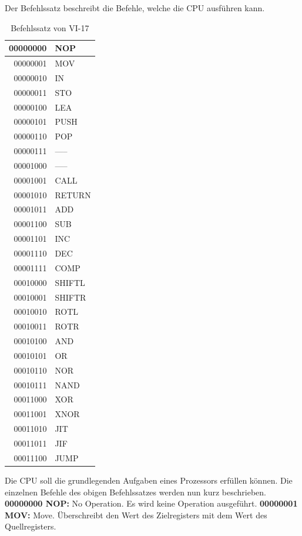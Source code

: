 \documentclass[12pt]{article}
\begin{document}
Der Befehlssatz beschreibt die Befehle, welche die CPU ausführen kann.
\newpage
\begin{table}[!htb]
\centering
\caption{Befehlssatz von VI-17}
\begin{tabular}{|r|l|}
  \hline
  00000000 & NOP \\
  \hline
  00000001 & MOV\\ 
  \hline
  00000010 & IN\\
  \hline
  00000011 & STO\\
  \hline
  00000100 & LEA\\
  \hline
  00000101 & PUSH \\ 
  \hline
  00000110 & POP\\
  \hline
  00000111 & -----\\
 \hline
  00001000 & ----- \\
  \hline
  00001001 & CALL\\ 
  \hline
  00001010 & RETURN\\
  \hline
  00001011 & ADD\\
  \hline 
 00001100 & SUB \\
  \hline
  00001101 & INC\\ 
  \hline
  00001110 & DEC\\
  \hline
  00001111 & COMP\\
  \hline
  00010000 & SHIFTL\\
  \hline
  00010001 & SHIFTR\\ 
  \hline
  00010010 & ROTL\\
  \hline
  00010011 & ROTR\\
  \hline
  00010100 & AND\\
  \hline
  00010101 & OR \\ 
  \hline
  00010110 & NOR\\
  \hline
  00010111 & NAND\\
  \hline
  00011000 & XOR\\
  \hline
  00011001 & XNOR \\
  \hline
  00011010 & JIT\\
  \hline
  00011011 & JIF\\
  \hline
  00011100 & JUMP\\
  \hline
\end{tabular}
\end{table}
\newpage
Die CPU soll die grundlegenden Aufgaben eines Prozessors erfüllen können. Die einzelnen Befehle des obigen Befehlssatzes werden nun kurz beschrieben.
\newline
\indent 
\textbf{00000000 NOP: }No Operation. Es wird keine Operation ausgeführt.
\newline
\indent 
\textbf{00000001 MOV: } Move. Überschreibt den Wert des Zielregisters mit dem Wert des Quellregisters. 
\end{document}
